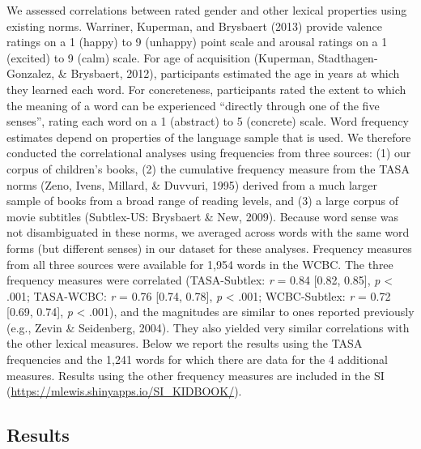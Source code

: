 \documentclass[english,,man,floatsintext]{apa6}
\begin{document}
We assessed correlations between rated gender and other lexical properties using existing norms. Warriner, Kuperman, and Brysbaert (2013) provide valence ratings on a 1 (happy) to 9 (unhappy) point scale and arousal ratings on a 1 (excited) to 9 (calm) scale. For age of acquisition (Kuperman, Stadthagen-Gonzalez, \& Brysbaert, 2012), participants estimated the age in years at which they learned each word. For concreteness, participants rated the extent to which the meaning of a word can be experienced \enquote{directly through one of the five senses}, rating each word on a 1 (abstract) to 5 (concrete) scale. Word frequency estimates depend on properties of the language sample that is used. We therefore conducted the correlational analyses using frequencies from three sources: (1) our corpus of children's books, (2) the cumulative frequency measure from the TASA norms (Zeno, Ivens, Millard, \& Duvvuri, 1995) derived from a much larger sample of books from a broad range of reading levels, and (3) a large corpus of movie subtitles (Subtlex-US: Brysbaert \& New, 2009). Because word sense was not disambiguated in these norms, we averaged across words with the same word forms (but different senses) in our dataset for these analyses. Frequency measures from all three sources were available for 1,954 words in the WCBC. The three frequency measures were correlated (TASA-Subtlex: \emph{r} = 0.84 {[}0.82, 0.85{]}, \emph{p} \textless{} .001; TASA-WCBC: \emph{r} = 0.76 {[}0.74, 0.78{]}, \emph{p} \textless{} .001; WCBC-Subtlex: \emph{r} = 0.72 {[}0.69, 0.74{]}, \emph{p} \textless{} .001), and the magnitudes are similar to ones reported previously (e.g., Zevin \& Seidenberg, 2004). They also yielded very similar correlations with the other lexical measures. Below we report the results using the TASA frequencies and the 1,241 words for which there are data for the 4 additional measures. Results using the other frequency measures are included in the SI (\url{https://mlewis.shinyapps.io/SI_KIDBOOK/}).

\hypertarget{results}{%
\subsection{Results}\label{results}}
\end{document}
